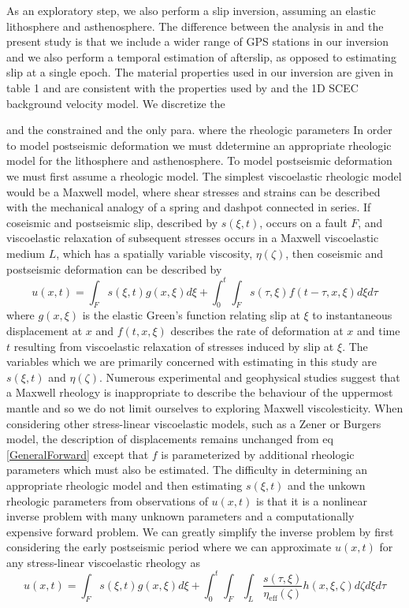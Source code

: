 \documentclass[12pt]{article}
\begin{document}
As an exploratory step, we also perform a slip inversion, assuming an elastic lithosphere and asthenosphere.  The difference between the analysis in  \cite{Rollins2015} and the present study is that we include a wider range of GPS stations in our inversion and we also perform a temporal estimation of afterslip, as opposed to estimating slip at a single epoch. The material properties used in our inversion are given in table 1 and are consistent with the properties used by \cite{Wei2011a} and the 1D SCEC background velocity model.  We discretize the          

 and the constrained and the only para.  where the rheologic parameters       
In order to model postseismic deformation we must ddetermine an appropriate rheologic model for the lithosphere and asthenosphere.  
To model postseismic deformation we must first assume a rheologic model.  The simplest viscoelastic rheologic model would be a Maxwell model, where shear stresses and strains can be described with the mechanical analogy of a spring and dashpot connected in series.  If coseismic and postseismic slip, described by $s(\xi,t)$, occurs on a fault $F$, and viscoelastic relaxation of subsequent stresses occurs in a Maxwell viscoelastic medium $L$, which has a spatially variable viscosity, $\eta(\zeta)$, then coseismic and postseismic deformation can be described by 
\begin{equation}\label{GeneralForward}
  u(x,t) = \int_F s(\xi,t)g(x,\xi)d\xi + 
           \int_0^t\int_F s(\tau,\xi) f(t-\tau,x,\xi) d\xi d\tau
\end{equation}
where $g(x,\xi)$ is the elastic Green's function relating slip at $\xi$ to instantaneous displacement at $x$ and $f(t,x,\xi)$ describes the rate of deformation at $x$ and time $t$ resulting from viscoelastic relaxation of stresses induced by slip  at $\xi$.  The variables which we are primarily concerned with estimating in this study are $s(\xi,t)$ and $\eta(\zeta)$.  Numerous experimental and geophysical studies suggest that a Maxwell rheology is inappropriate to describe the behaviour of the uppermost mantle \cite{Chopra1997} \cite{Pollitz2003} \cite{Freed2004} and so we do not limit ourselves to exploring Maxwell viscolesticity.  When considering other stress-linear viscoelastic models, such as a Zener or Burgers model, the description of displacements remains unchanged from eq \ref{GeneralForward} except that $f$ is parameterized by additional rheologic parameters which must also be estimated.  The difficulty in  determining an appropriate rheologic model and then estimating $s(\xi,t)$ and the unkown rheologic parameters from observations of $u(x,t)$ is that it is a nonlinear inverse problem with many unknown parameters and a computationally expensive forward problem.  We can greatly simplify the inverse problem by first considering the early postseismic period where we can approximate $u(x,t)$ for any stress-linear viscoelastic rheology as
\begin{equation}\label{ApproxForward}
  u(x,t) = \int_F s(\xi,t)g(x,\xi)d\xi + 
           \int_0^t\int_F\int_L \frac{s(\tau,\xi)}{\eta_\mathrm{eff}(\zeta)} h(x,\xi,\zeta) d\zeta d\xi d\tau
\end{equation}
\end{document}
